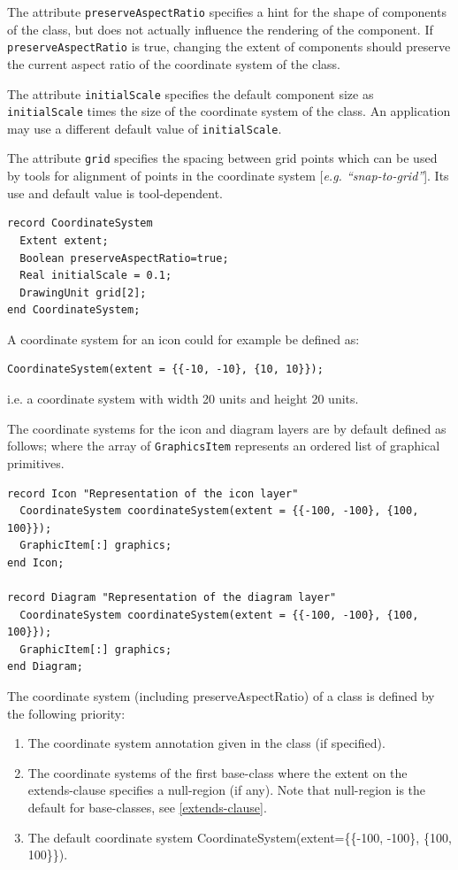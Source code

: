 The attribute \lstinline!preserveAspectRatio! specifies a hint for the shape of
components of the class, but does not actually influence the rendering of the component.
If \lstinline!preserveAspectRatio! is true, changing the
extent of components should preserve the current aspect ratio of the coordinate
system of the class.

The attribute \lstinline!initialScale! specifies the default component size as
\lstinline!initialScale! times the size of the coordinate system of the class. An
application may use a different default value of \lstinline!initialScale!.

The attribute \lstinline!grid! specifies the spacing between grid points which can
be used by tools for alignment of points in the coordinate system
{[}\emph{e.g. ``snap-to-grid''}{]}. Its use and default value is
tool-dependent.

\begin{lstlisting}[language=modelica]
record CoordinateSystem
  Extent extent;
  Boolean preserveAspectRatio=true;
  Real initialScale = 0.1;
  DrawingUnit grid[2];
end CoordinateSystem;
\end{lstlisting}

\begin{example}
A coordinate system for an icon could for example be defined as:
\begin{lstlisting}[language=modelica]
CoordinateSystem(extent = {{-10, -10}, {10, 10}});
\end{lstlisting}
i.e. a coordinate system with width 20 units and height 20 units.
\end{example}

The coordinate systems for the icon and diagram layers are by default
defined as follows; where the array of \lstinline!GraphicsItem! represents an
ordered list of graphical primitives.

\begin{lstlisting}[language=modelica]
record Icon "Representation of the icon layer"
  CoordinateSystem coordinateSystem(extent = {{-100, -100}, {100, 100}});
  GraphicItem[:] graphics;
end Icon;

record Diagram "Representation of the diagram layer"
  CoordinateSystem coordinateSystem(extent = {{-100, -100}, {100, 100}});
  GraphicItem[:] graphics;
end Diagram;
\end{lstlisting}
The coordinate system (including preserveAspectRatio) of a class is
defined by the following priority:

\begin{enumerate}
\item
  The coordinate system annotation given in the class (if specified).
\item
  The coordinate systems of the first base-class where the extent on the
  extends-clause specifies a null-region (if any). Note that null-region
  is the default for base-classes, see \autoref{extends-clause}.
\item
  The default coordinate system CoordinateSystem(extent=\{\{-100,
  -100\}, \{100, 100\}\}).
\end{enumerate}

